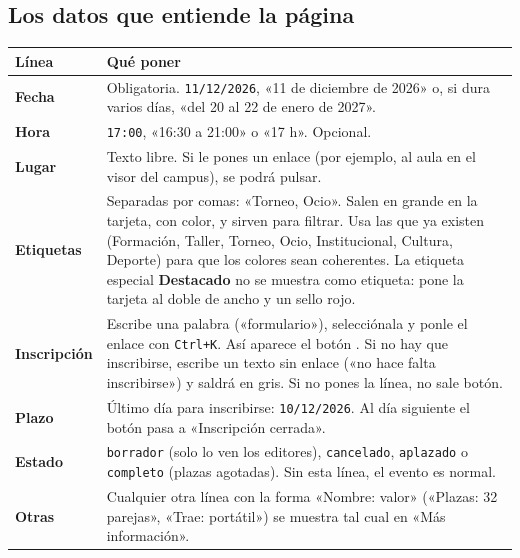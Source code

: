 \documentclass[a4paper,11pt]{article}
\newcommand{\boton}[1]{\tcbox[on line, colback=white, colframe=DarkGray3, boxrule=0.4pt, arc=1mm,
  left=1.2mm, right=1.2mm, top=0.3mm, bottom=0.3mm, boxsep=0pt]{\small\strut #1}}
\begin{document}
\subsection{Los datos que entiende la página}
\begin{tabularx}{\linewidth}{@{}>{\bfseries}l X@{}}
\toprule
Línea & Qué poner \\
\midrule
Fecha & Obligatoria. \texttt{11/12/2026}, «11 de diciembre de 2026» o, si dura varios días,
        «del 20 al 22 de enero de 2027». \\
Hora & \texttt{17:00}, «16:30 a 21:00» o «17 h». Opcional. \\
Lugar & Texto libre. Si le pones un enlace (por ejemplo, al aula en el visor del campus), se podrá pulsar. \\
Etiquetas & Separadas por comas: «Torneo, Ocio». Salen en grande en la tarjeta, con color, y sirven para
        filtrar. Usa las que ya existen (Formación, Taller, Torneo, Ocio, Institucional, Cultura, Deporte)
        para que los colores sean coherentes. La etiqueta especial \textbf{Destacado} no se muestra como
        etiqueta: pone la tarjeta al doble de ancho y un sello rojo. \\
Inscripción & Escribe una palabra («formulario»), selecciónala y ponle el enlace con \texttt{Ctrl+K}.
        Así aparece el botón \boton{Inscribirse}. Si no hay que inscribirse, escribe un texto sin enlace
        («no hace falta inscribirse») y saldrá en gris. Si no pones la línea, no sale botón. \\
Plazo & Último día para inscribirse: \texttt{10/12/2026}. Al día siguiente el botón pasa a
        «Inscripción cerrada». \\
Estado & \texttt{borrador} (solo lo ven los editores), \texttt{cancelado}, \texttt{aplazado} o
        \texttt{completo} (plazas agotadas). Sin esta línea, el evento es normal. \\
Otras & Cualquier otra línea con la forma «Nombre: valor» («Plazas: 32 parejas», «Trae: portátil»)
        se muestra tal cual en «Más información». \\
\bottomrule
\end{tabularx}
\end{document}

